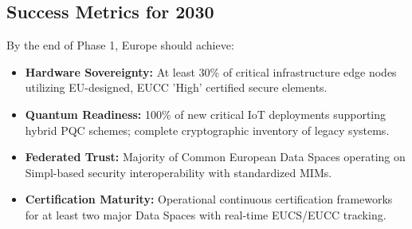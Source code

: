 \documentclass[12pt,a4paper]{article}
\begin{document}
\subsection*{Success Metrics for 2030}
By the end of Phase 1, Europe should achieve:
\begin{itemize}
    \item \textbf{Hardware Sovereignty:} At least 30\% of critical infrastructure edge nodes utilizing EU-designed, EUCC 'High' certified secure elements.
    \item \textbf{Quantum Readiness:} 100\% of new critical IoT deployments supporting hybrid PQC schemes; complete cryptographic inventory of legacy systems.
    \item \textbf{Federated Trust:} Majority of Common European Data Spaces operating on Simpl-based security interoperability with standardized MIMs.
    \item \textbf{Certification Maturity:} Operational continuous certification frameworks for at least two major Data Spaces with real-time EUCS/EUCC tracking.
\end{itemize}
\end{document}
